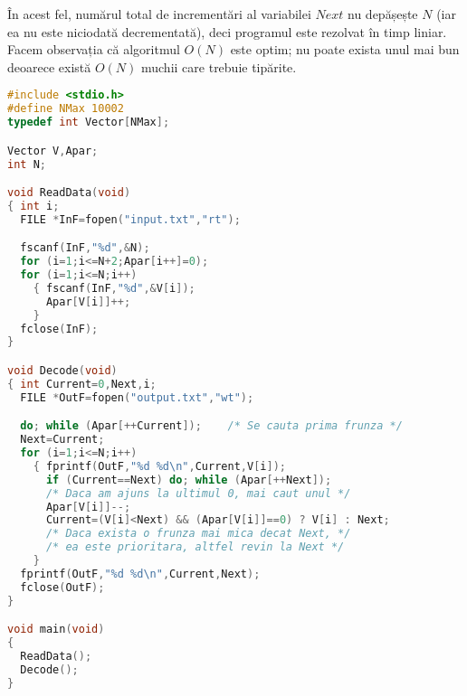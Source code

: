 În acest fel, numărul total de incrementări al variabilei $Next$ nu depășește
$N$ (iar ea nu este niciodată decrementată), deci programul este rezolvat în
timp liniar. Facem observația că algoritmul $O(N)$ este optim; nu poate exista
unul mai bun deoarece există $O(N)$ muchii care trebuie tipărite.

\begin{lstlisting}[language=C]
#include <stdio.h>
#define NMax 10002
typedef int Vector[NMax];

Vector V,Apar;
int N;

void ReadData(void)
{ int i;
  FILE *InF=fopen("input.txt","rt");

  fscanf(InF,"%d",&N);
  for (i=1;i<=N+2;Apar[i++]=0);
  for (i=1;i<=N;i++)
    { fscanf(InF,"%d",&V[i]);
      Apar[V[i]]++;
    }
  fclose(InF);
}

void Decode(void)
{ int Current=0,Next,i;
  FILE *OutF=fopen("output.txt","wt");

  do; while (Apar[++Current]);    /* Se cauta prima frunza */
  Next=Current;
  for (i=1;i<=N;i++)
    { fprintf(OutF,"%d %d\n",Current,V[i]);
      if (Current==Next) do; while (Apar[++Next]);
      /* Daca am ajuns la ultimul 0, mai caut unul */
      Apar[V[i]]--;
      Current=(V[i]<Next) && (Apar[V[i]]==0) ? V[i] : Next;
      /* Daca exista o frunza mai mica decat Next, */
      /* ea este prioritara, altfel revin la Next */
    }
  fprintf(OutF,"%d %d\n",Current,Next);
  fclose(OutF);
}

void main(void)
{
  ReadData();
  Decode();
}
\end{lstlisting}
